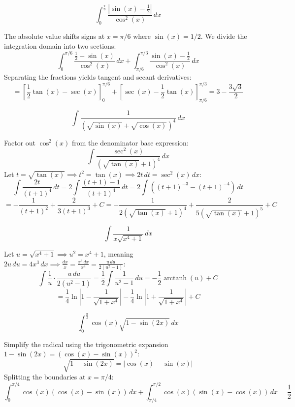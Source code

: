 \begin{questions}

\question
\[ \int_{0}^{\frac{\pi}{3}} \frac{|\sin(x)-\frac{1}{2}|}{\cos^{2}(x)} \, dx \]
\begin{solution}
The absolute value shifts signs at $x = \pi/6$ where $\sin(x) = 1/2$. We divide the integration domain into two sections:
\[ \int_{0}^{\pi/6} \frac{\frac{1}{2}-\sin(x)}{\cos^2(x)} \, dx + \int_{\pi/6}^{\pi/3} \frac{\sin(x)-\frac{1}{2}}{\cos^2(x)} \, dx \]
Separating the fractions yields tangent and secant derivatives:
\[ = \left[ \frac{1}{2}\tan(x) - \sec(x) \right]_{0}^{\pi/6} + \left[ \sec(x) - \frac{1}{2}\tan(x) \right]_{\pi/6}^{\pi/3} = 3 - \frac{3\sqrt{3}}{2} \]
\end{solution}

\question
\[ \int \frac{1}{(\sqrt{\sin(x)}+\sqrt{\cos(x)})^{4}} \, dx \]
\begin{solution}
Factor out $\cos^2(x)$ from the denominator base expression:
\[ \int \frac{\sec^2(x)}{(\sqrt{\tan(x)}+1)^4} \, dx \]
Let $t = \sqrt{\tan(x)} \implies t^2 = \tan(x) \implies 2t \, dt = \sec^2(x) \, dx$:
\[ \int \frac{2t}{(t+1)^4} \, dt = 2\int \frac{(t+1)-1}{(t+1)^4} \, dt = 2\int \left((t+1)^{-3} - (t+1)^{-4}\right) \, dt \]
\[ = -\frac{1}{(t+1)^2} + \frac{2}{3(t+1)^3} + C = -\frac{1}{2(\sqrt{\tan(x)}+1)^4} + \frac{2}{5(\sqrt{\tan(x)}+1)^5} + C \]
\end{solution}

\question
\[ \int \frac{1}{x\sqrt{x^{4}+1}} \, dx \]
\begin{solution}
Let $u = \sqrt{x^4+1} \implies u^2 = x^4+1$, meaning $2u \, du = 4x^3 \, dx \implies \frac{dx}{x} = \frac{x^3 \, dx}{x^4} = \frac{u \, du}{2(u^2-1)}$:
\[ \int \frac{1}{u} \cdot \frac{u \, du}{2(u^2-1)} = \frac{1}{2}\int \frac{1}{u^2-1} \, du = -\frac{1}{2}\operatorname{arctanh}(u) + C \]
\[ = \frac{1}{4}\ln\left|1-\frac{1}{\sqrt{1+x^4}}\right| - \frac{1}{4}\ln\left|1+\frac{1}{\sqrt{1+x^4}}\right| + C \]
\end{solution}

\question
\[ \int_{0}^{\frac{\pi}{2}} \cos(x)\sqrt{1-\sin(2x)} \, dx \]
\begin{solution}
Simplify the radical using the trigonometric expansion $1-\sin(2x) = (\cos(x)-\sin(x))^2$:
\[ \sqrt{1-\sin(2x)} = |\cos(x)-\sin(x)| \]
Splitting the boundaries at $x = \pi/4$:
\[ \int_{0}^{\pi/4} \cos(x)(\cos(x)-\sin(x)) \, dx + \int_{\pi/4}^{\pi/2} \cos(x)(\sin(x)-\cos(x)) \, dx = \frac{1}{2} \]
\end{solution}


\end{questions}
